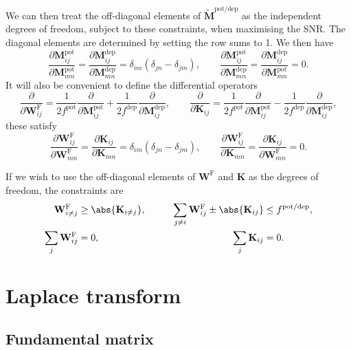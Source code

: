 \documentclass[12pt]{article}
\newcommand{\W}{\mathbf{W}}
\newcommand{\M}{\mathbf{M}}
\newcommand{\enc}{\mathbf{K}}
\newcommand{\frg}{\W^{\mathrm{F}}}
\newcommand{\pot}{^{\text{pot}}}
\newcommand{\dep}{^{\text{dep}}}
\newcommand{\potdep}{^{\text{pot/dep}}}
\newcommand{\Mh}{\widetilde{\M}}
\renewcommand{\pdiff}[2]{\frac{\partial #1}{\partial #2}}
\begin{document}
We can then treat the off-diagonal elements of $\Mh\potdep$ as the independent degrees of freedom, subject to these constraints, when maximising the SNR.
The diagonal elements are determined by setting the row sums to 1.
We then have
%
\begin{equation}\label{eq:derivpd}
  \pdiff{\M\pot_{ij}}{\M\pot_{mn}} = \pdiff{\M\dep_{ij}}{\M\dep_{mn}} = \delta_{im}(\delta_{jn}-\delta_{jm}),
  \qquad
  \pdiff{\M\pot_{ij}}{\M\dep_{mn}} = \pdiff{\M\dep_{ij}}{\M\pot_{mn}} = 0.
\end{equation}
%
It will also be convenient to define the differential operators
%
\begin{equation}\label{eq:pertfe}
  \pdiff{}{\frg_{ij}} = \frac{1}{2f\pot} \pdiff{}{\M\pot_{ij}} + \frac{1}{2f\dep} \pdiff{}{\M\dep_{ij}},
  \qquad
  \pdiff{}{\enc_{ij}} = \frac{1}{2f\pot} \pdiff{}{\M\pot_{ij}} - \frac{1}{2f\dep} \pdiff{}{\M\dep_{ij}},
\end{equation}
%
these satisfy
%
\begin{equation}\label{eq:derivfe}
  \pdiff{\frg_{ij}}{\frg_{mn}} = \pdiff{\enc_{ij}}{\enc_{mn}} = \delta_{im}(\delta_{jn}-\delta_{jm}),
  \qquad
  \pdiff{\frg_{ij}}{\enc_{mn}} = \pdiff{\enc_{ij}}{\frg_{mn}} = 0.
\end{equation}
%

If we wish to use the off-diagonal elements of $\frg$ and $\enc$ as the degrees of freedom, the constraints are
%
\begin{equation}\label{eq:constrfe}
\begin{aligned}
  \frg_{i \neq j}   &\geq \abs{ \enc_{i \neq j} }, &\qquad
  \sum_{j\neq i}\frg_{ij} \pm \abs{ \enc_{ij} } &\leq f\potdep, \\
  \sum_j \frg_{ij} &=0, &
  \sum_j \enc_{ij} &=0.
\end{aligned}
\end{equation}
%




\section{Laplace transform}\label{sec:laplace}

\subsection{Fundamental matrix \etc}\label{sec:lfund}
\end{document}
